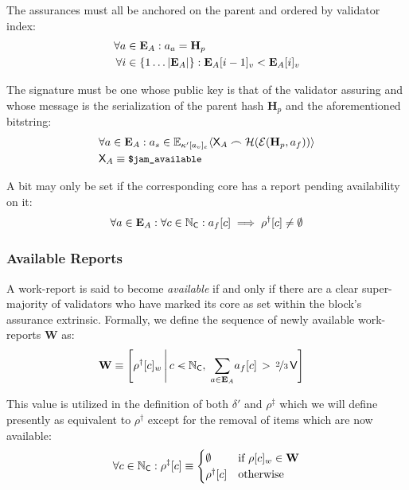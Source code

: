 The assurances must all be anchored on the parent and ordered by validator index:
\begin{align}
  \forall a &\in \mathbf{E}_A : a_a = \mathbf{H}_p \\
  \forall i &\in \{ 1\dots|\mathbf{E}_A| \} : \mathbf{E}_A[i - 1]_v < \mathbf{E}_A[i]_v
\end{align}

The signature must be one whose public key is that of the validator assuring and whose message is the serialization of the parent hash $\mathbf{H}_p$ and the aforementioned bitstring:
\begin{align}
  &\forall a \in \mathbf{E}_A : a_s \in \mathbb{E}_{\kappa'[a_v]_e}\langle\mathsf{X}_A\frown \mathcal{H}(\mathcal{E}(\mathbf{H}_p, a_f))\rangle \\
  &\mathsf{X}_A \equiv \text{{\small \texttt{\$jam\_available}}}
\end{align}

A bit may only be set if the corresponding core has a report pending availability on it:
\begin{align}
  \forall a \in \mathbf{E}_A : \forall c \in \mathbb{N}_\mathsf{C} : a_f[c] \implies \rho^\dagger[c] \ne \emptyset
\end{align}

\subsubsection{Available Reports}
A work-report is said to become \emph{available} if and only if there are a clear  super-majority of validators who have marked its core as set within the block's assurance extrinsic. Formally, we define the sequence of newly available work-reports $\mathbf{W}$ as:
\begin{align}\label{eq:availableworkreports}
  \mathbf{W} &\equiv \left[\rho^\dagger[c]_w\,\middle\vert\,c \orderedin \N_\mathsf{C},\;\sum_{a \in \xtassurances}\!a_f[c]\,>\,\nicefrac{2}{3}\,\mathsf{V}\right]
\end{align}

This value is utilized in the definition of both $\delta'$ and $\rho^\ddagger$ which we will define presently as equivalent to $\rho^\dagger$ except for the removal of items which are now available:
\begin{align}
  \forall c \in \mathbb{N}_\mathsf{C}: \rho^\ddagger[c] \equiv \begin{cases}
    \emptyset &\text{if }\rho[c]_w \in \mathbf{W}\\
    \rho^\dagger[c] &\text{otherwise}
  \end{cases}
\end{align}











